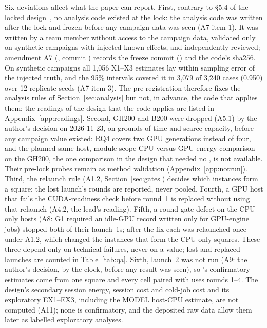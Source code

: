 \documentclass[sigconf]{acmart}
\begin{document}
Six deviations affect what the paper can report. First, contrary to \S5.4 of the locked
design~\citelock{}, no analysis code existed at the lock: the analysis code was written after the
lock and frozen before any campaign data was seen (A7 item 1). It was written by a team member
without access to the campaign data, validated only on synthetic campaigns with injected known
effects, and independently reviewed; amendment A7 (, commit
) records the freeze commit
() and the code's sha256. On synthetic campaigns all
1,056 X1--X3 estimates lay within sampling error of the injected truth, and the 95\% intervals
covered it in 3,079 of 3,240 cases (0.950) over 12 replicate seeds (A7 item 3). The
pre-registration therefore fixes the analysis rules of Section~\ref{sec:analysis} but not, in
advance, the code that applies them; the readings of the design that the code applies are listed in
Appendix~\ref{app:readings}.
Second, GH200 and B200 were dropped (A5.1) by
the author's decision on 2026-11-23, on grounds of time and scarce capacity, before any campaign
value existed: RQ4 covers two GPU generations instead of four, and the planned same-host,
module-scope CPU-versus-GPU energy comparison on the GH200, the one comparison in the design that
needed no \NOne, is not available. Their pre-lock probes remain as method validation
(Appendix~\ref{app:notrun}). Third, the relaunch rule (A1.2, Section~\ref{sec:gates}) decides which instances form a square;
the lost launch's rounds are reported, never pooled. Fourth, a GPU host that fails the
CUDA-readiness check before round~1 is replaced without using that relaunch (A4.2, the lead's
reading). Fifth, a round-gate defect on the CPU-only hosts (A8: G1 required an idle-GPU record
written only for GPU-engine jobs) stopped both of their launch~1s; after the fix each was relaunched
once under A1.2, which changed the instances that form the CPU-only squares. These three depend only
on technical failures, never on a value; lost and replaced launches are counted in Table~\ref{tab:qa}.
Sixth, \CG{} launch~2 was not run (A9: the author's decision, by the clock, before any result was seen),
so \CG's confirmatory estimates come from one square and every cell paired with \CG{} uses rounds 1--4.
The design's secondary session energy, session cost and cold-job cost and its exploratory EX1--EX3,
including the MODEL host-CPU estimate, are not computed (A11); none is confirmatory, and the deposited raw
data allow them later as labelled exploratory analyses.
\end{document}
